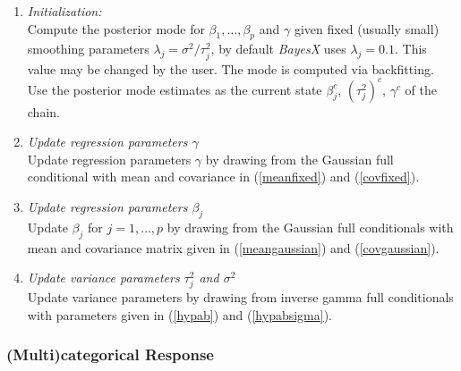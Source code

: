 \documentclass[11pt,a4paper,twoside]{bayesxarticle}
\begin{document}
\begin{enumerate}
\item {\em Initialization:} \\
Compute the posterior mode for $\beta_1,\dots,\beta_p$ and
$\gamma$ given fixed (usually small) smoothing parameters
$\lambda_j = \sigma^2/\tau^2_j$, by default {\em BayesX} uses
$\lambda_j = 0.1$. This value may be changed by the user. The mode
is computed via backfitting. Use the posterior mode estimates as
the current state $\beta_j^c$, $(\tau_j^2)^c$, $\gamma^c$ of the
chain.
\item {\em Update regression parameters $\gamma$} \\
Update regression parameters $\gamma$ by drawing from the Gaussian
full conditional with mean and covariance in (\ref{meanfixed}) and
(\ref{covfixed}).
\item {\em Update regression parameters $\beta_j$} \\
Update $\beta_j$ for $j=1,\dots,p$ by drawing from the Gaussian
full conditionals with mean and covariance matrix given in
(\ref{meangaussian}) and (\ref{covgaussian}).
\item {\em Update variance parameters $\tau^2_j$ and $\sigma^2$} \\
Update variance parameters by drawing from inverse gamma full
conditionals with parameters given in (\ref{hypab}) and
(\ref{hypabsigma}).
\end{enumerate}

\subsubsection{(Multi)categorical Response}
\label{mulitcategoricalresp} 
\end{document}
